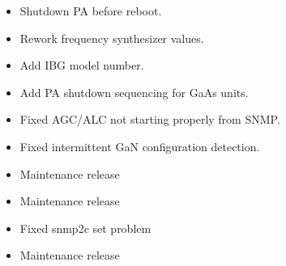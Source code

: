 \documentclass[letterpaper,10pt,english]{sphinxhowto}
\begin{document}
\begin{description}
\begin{itemize}
\item {} 
\sphinxAtStartPar
Shutdown PA before reboot.

\item {} 
\sphinxAtStartPar
Rework frequency synthesizer values.

\item {} 
\sphinxAtStartPar
Add IBG model number.

\item {} 
\sphinxAtStartPar
Add PA shutdown sequencing for GaAs units.

\end{itemize}

\begin{itemize}
\item {} 
\sphinxAtStartPar
Fixed AGC/ALC not starting properly from SNMP.

\end{itemize}

\begin{itemize}
\item {} 
\sphinxAtStartPar
Fixed intermittent GaN conﬁguration detection.

\end{itemize}

\begin{itemize}
\item {} 
\sphinxAtStartPar
Maintenance release

\end{itemize}

\begin{itemize}
\item {} 
\sphinxAtStartPar
Maintenance release

\end{itemize}

\begin{itemize}
\item {} 
\sphinxAtStartPar
Fixed snmp2c set problem

\end{itemize}

\begin{itemize}
\item {} 
\sphinxAtStartPar
Maintenance release

\end{itemize}


\end{description}
\end{document}

